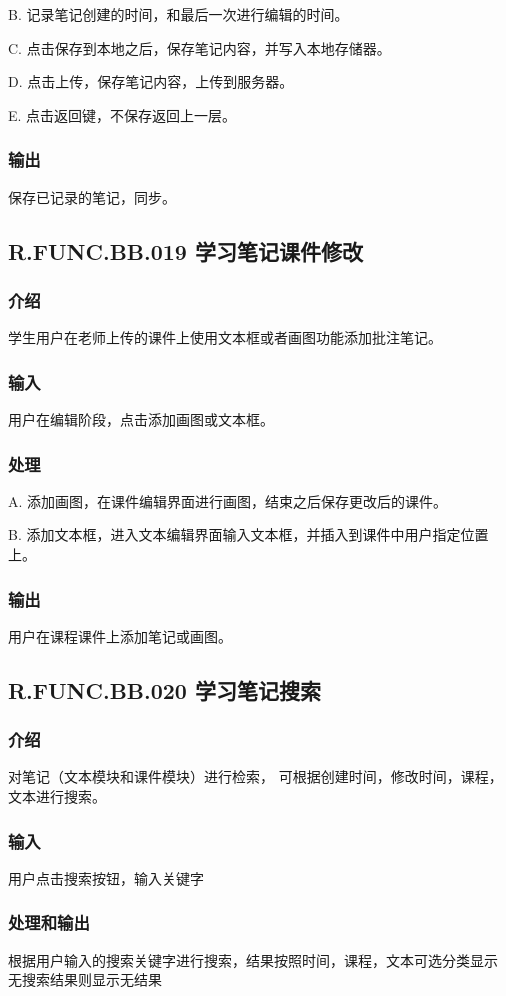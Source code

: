 	B. 记录笔记创建的时间，和最后一次进行编辑的时间。

	C. 点击保存到本地之后，保存笔记内容，并写入本地存储器。

	D. 点击上传，保存笔记内容，上传到服务器。

	E. 点击返回键，不保存返回上一层。
    \subsubsection{输出}
	保存已记录的笔记，同步。
 \subsection{R.FUNC.BB.019 学习笔记课件修改}
    \subsubsection{介绍}
	学生用户在老师上传的课件上使用文本框或者画图功能添加批注笔记。
    \subsubsection{输入}
	用户在编辑阶段，点击添加画图或文本框。
    \subsubsection{处理}
	A. 添加画图，在课件编辑界面进行画图，结束之后保存更改后的课件。

	B. 添加文本框，进入文本编辑界面输入文本框，并插入到课件中用户指定位置上。
    \subsubsection{输出}
	用户在课程课件上添加笔记或画图。

 \subsection{R.FUNC.BB.020 学习笔记搜索}
    \subsubsection{介绍}
	对笔记（文本模块和课件模块）进行检索，
可根据创建时间，修改时间，课程，文本进行搜索。
    \subsubsection{输入}
	用户点击搜索按钮，输入关键字
    \subsubsection{处理和输出}
	根据用户输入的搜索关键字进行搜索，结果按照时间，课程，文本可选分类显示
无搜索结果则显示无结果

